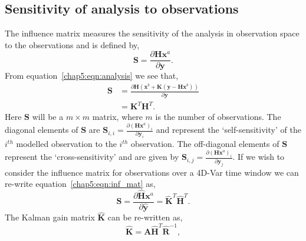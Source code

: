 

\subsection{Sensitivity of analysis to observations} \label{chap5:sec:inf_mat}

The influence matrix measures the sensitivity of the analysis in observation space to the observations \citep{Cardinali2004} and is defined by,
\begin{equation}
\textbf{S} = \frac{\partial \textbf{H}\textbf{x}^{a}}{\partial \textbf{y}}. \label{chap5:eqn:inf_mat}
\end{equation}
From equation~\eqref{chap5:eqn:analysis} we see that,
\begin{equation}
\begin{split}
\textbf{S} &= \frac{\partial \textbf{H}(\textbf{x}^{b} + \textbf{K}(\textbf{y} - \textbf{H}\textbf{x}^{b}))}{\partial \textbf{y}} \\
	       &= \textbf{K}^{T}\textbf{H}^{T}.
\end{split}
\end{equation}
Here $\textbf{S}$ will be a $m \times m$ matrix, where $m$ is the number of observations. The diagonal elements of $\textbf{S}$ are $\textbf{S}_{i,i} = \frac{\partial (\textbf{H}\textbf{x}^{a})_{i}}{\partial \textbf{y}_{i}}$ and represent the `self-sensitivity' of the $i^{th}$ modelled observation to the $i^{th}$ observation. The off-diagonal elements of $\textbf{S}$ represent the `cross-sensitivity' and are given by $\textbf{S}_{i,j} = \frac{\partial (\textbf{H}\textbf{x}^{a})_{i}}{\partial \textbf{y}_{j}}$. If we wish to consider the influence matrix for observations over a 4D-Var time window we can re-write equation~\eqref{chap5:eqn:inf_mat} as,
\begin{equation}
\textbf{S} = \frac{\partial \hat{\textbf{H}}\textbf{x}^{a}}{\partial \hat{\textbf{y}}} = \hat{\textbf{K}}^{T}\hat{\textbf{H}}^{T}. \label{chap5:eqn:4dinf_mat}
\end{equation}
The Kalman gain matrix $\hat{\textbf{K}}$ can be re-written as,
\begin{equation}
\hat{\textbf{K}} = \textbf{A}\hat{\textbf{H}}^{T}\hat{\textbf{R}}^{-1}, \label{chap5:eqn:analysis_kgain}
\end{equation}
